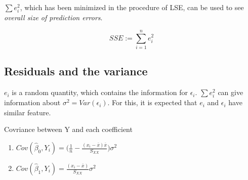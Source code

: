 \documentclass[]{book}
\newenvironment{Shaded}{\begin{snugshade}}{\end{snugshade}}
\newcommand{\CommentTok}[1]{\textcolor[rgb]{0.56,0.35,0.01}{\textit{#1}}}
\newcommand{\DataTypeTok}[1]{\textcolor[rgb]{0.13,0.29,0.53}{#1}}
\newcommand{\KeywordTok}[1]{\textcolor[rgb]{0.13,0.29,0.53}{\textbf{#1}}}
\newcommand{\NormalTok}[1]{#1}
\newcommand{\OperatorTok}[1]{\textcolor[rgb]{0.81,0.36,0.00}{\textbf{#1}}}
\newcommand{\StringTok}[1]{\textcolor[rgb]{0.31,0.60,0.02}{#1}}
\theoremstyle{definition}
\theoremstyle{definition}
\theoremstyle{definition}
\theoremstyle{remark}
\let\BeginKnitrBlock\begin \let\EndKnitrBlock\end
\begin{document}
\begin{Shaded}
\end{Shaded}

\(\sum e_i^2\), which has been minimized in the procedure of LSE, can be used to see \emph{overall size of prediction errors}.

\BeginKnitrBlock{definition}[Residual Sum of Squares]
\protect\hypertarget{def:sse}{}{\label{def:sse} {} }\[SSE := \sum_{i = 1}^n e_i^2\]
\EndKnitrBlock{definition}

\hypertarget{residuals-and-the-variance}{%
\subsection{Residuals and the variance}\label{residuals-and-the-variance}}

\(e_i\) is a random quantity, which contains the information for \(\epsilon_i\). \(\sum e_i^2\) can give information about \(\sigma^2 = Var(\epsilon_i)\). For this, it is expected that \(e_i\) and \(\epsilon_i\) have similar feature.

\BeginKnitrBlock{lemma}
\protect\hypertarget{lem:yandbet}{}{\label{lem:yandbet} }Covriance between Y and each coefficient

\begin{enumerate}[label=(\alph*)]
  \item $Cov(\hat\beta_0, Y_i) = \bigg( \frac{1}{n} - \frac{(x_i - \overline{x})\overline{x}}{S_{XX}} \bigg)\sigma^2$ \label{itm:yandbetone}
  \item $Cov(\hat\beta_1, Y_i) = \frac{(x_i - \overline{x})}{S_{XX}}\sigma^2$ \label{itm:yandbettwo}
\end{enumerate}
\EndKnitrBlock{lemma}
\end{document}

